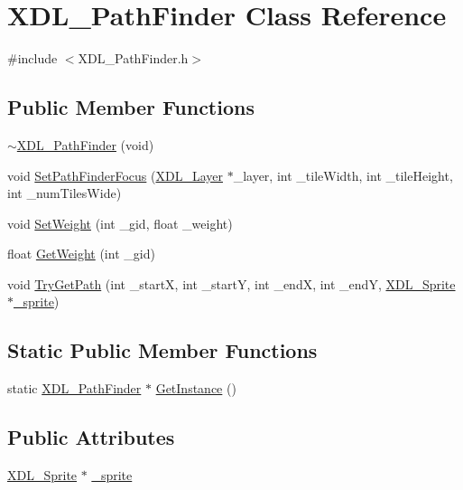 \hypertarget{class_x_d_l___path_finder}{\section{X\-D\-L\-\_\-\-Path\-Finder Class Reference}
\label{class_x_d_l___path_finder}
}


{\ttfamily \#include $<$X\-D\-L\-\_\-\-Path\-Finder.\-h$>$}

\subsection*{Public Member Functions}
\begin{DoxyCompactItemize}
\item 
\hyperlink{class_x_d_l___path_finder_a6d718c1198ba8c90e635c28aa5b7e3a1}{$\sim$\-X\-D\-L\-\_\-\-Path\-Finder} (void)
\item 
void \hyperlink{class_x_d_l___path_finder_aae1ebca620ad8c1875b176419b49a8ff}{Set\-Path\-Finder\-Focus} (\hyperlink{class_x_d_l___layer}{X\-D\-L\-\_\-\-Layer} $\ast$\-\_\-layer, int \-\_\-tile\-Width, int \-\_\-tile\-Height, int \-\_\-num\-Tiles\-Wide)
\item 
void \hyperlink{class_x_d_l___path_finder_ae89492cd495ebda75e3823fc568b3318}{Set\-Weight} (int \-\_\-gid, float \-\_\-weight)
\item 
float \hyperlink{class_x_d_l___path_finder_ac303afb330b8f9f539cd2efe53fbf091}{Get\-Weight} (int \-\_\-gid)
\item 
void \hyperlink{class_x_d_l___path_finder_a240f6aa9544b77d7c9b21e2e84087656}{Try\-Get\-Path} (int \-\_\-start\-X, int \-\_\-start\-Y, int \-\_\-end\-X, int \-\_\-end\-Y, \hyperlink{class_x_d_l___sprite}{X\-D\-L\-\_\-\-Sprite} $\ast$\hyperlink{class_x_d_l___path_finder_ae21d6af420119875362d125ebf5c73b6}{\-\_\-sprite})
\end{DoxyCompactItemize}
\subsection*{Static Public Member Functions}
\begin{DoxyCompactItemize}
\item 
static \hyperlink{class_x_d_l___path_finder}{X\-D\-L\-\_\-\-Path\-Finder} $\ast$ \hyperlink{class_x_d_l___path_finder_a4a258141f72bd99535dd5ab64272a66f}{Get\-Instance} ()
\end{DoxyCompactItemize}
\subsection*{Public Attributes}
\begin{DoxyCompactItemize}
\item 
\hyperlink{class_x_d_l___sprite}{X\-D\-L\-\_\-\-Sprite} $\ast$ \hyperlink{class_x_d_l___path_finder_ae21d6af420119875362d125ebf5c73b6}{\-\_\-sprite}
\end{DoxyCompactItemize}
